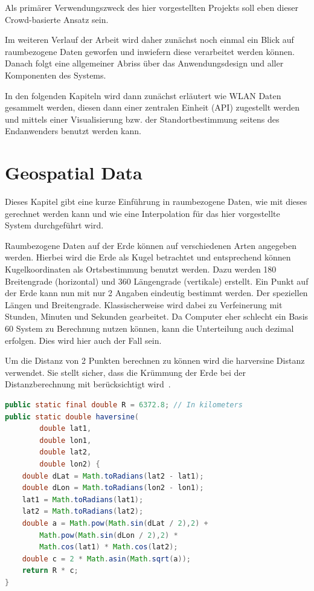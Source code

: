 \documentclass[11pt,a4paper]{article}
\begin{document}
Als primärer Verwendungszweck des hier vorgestellten Projekts soll eben dieser Crowd-basierte Ansatz sein.

Im weiteren Verlauf der Arbeit wird daher zunächst noch einmal ein Blick auf raumbezogene Daten geworfen und inwiefern diese verarbeitet werden können. Danach folgt eine allgemeiner Abriss über das Anwendungsdesign und aller Komponenten des Systems. 

In den folgenden Kapiteln wird dann zunächst erläutert wie WLAN Daten gesammelt werden, diesen dann einer zentralen Einheit (API) zugestellt werden und mittels einer Visualisierung bzw. der Standortbestimmung seitens des Endanwenders benutzt werden kann.


\section{Geospatial Data}

Dieses Kapitel gibt eine kurze Einführung in raumbezogene Daten, wie mit dieses gerechnet werden kann und wie eine Interpolation für das hier vorgestellte System durchgeführt wird.

Raumbezogene Daten auf der Erde können auf verschiedenen Arten angegeben werden. Hierbei wird die Erde als Kugel betrachtet und entsprechend können Kugelkoordinaten als Ortsbestimmung benutzt werden. Dazu werden 180 Breitengrade (horizontal) und 360 Längengrade (vertikale) erstellt. Ein Punkt auf der Erde kann nun mit nur 2 Angaben eindeutig bestimmt werden. Der speziellen Längen und Breitengrade. Klassischerweise wird dabei zu Verfeinerung mit Stunden, Minuten und Sekunden gearbeitet. Da Computer eher schlecht ein Basis 60 System zu Berechnung nutzen können, kann die Unterteilung auch dezimal erfolgen. Dies wird hier auch der Fall sein. 

Um die Distanz von 2 Punkten berechnen zu können wird die harversine Distanz verwendet. Sie stellt sicher, dass die Krümmung der Erde bei der Distanzberechnung mit berücksichtigt wird~\cite{harversine_distance}.

\begin{lstlisting}[language=Java]
public static final double R = 6372.8; // In kilometers
public static double haversine(
		double lat1, 
		double lon1, 
		double lat2, 
		double lon2) {
    double dLat = Math.toRadians(lat2 - lat1);
    double dLon = Math.toRadians(lon2 - lon1);
    lat1 = Math.toRadians(lat1);
    lat2 = Math.toRadians(lat2);
    double a = Math.pow(Math.sin(dLat / 2),2) +
    	Math.pow(Math.sin(dLon / 2),2) * 
    	Math.cos(lat1) * Math.cos(lat2);
    double c = 2 * Math.asin(Math.sqrt(a));
    return R * c;
}
\end{lstlisting}
\end{document}
